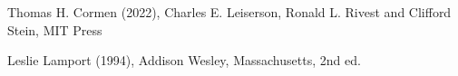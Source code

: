 \documentclass{article}
\begin{document}
	
	
    
    \begin{thebibliography}{2}
            Thomas H. Cormen (2022), Charles E. Leiserson, Ronald L. Rivest and Clifford Stein, MIT Press
    
            Leslie Lamport (1994), Addison
            Wesley, Massachusetts, 2nd ed.
            
    \end{thebibliography}
	
\end{document}
